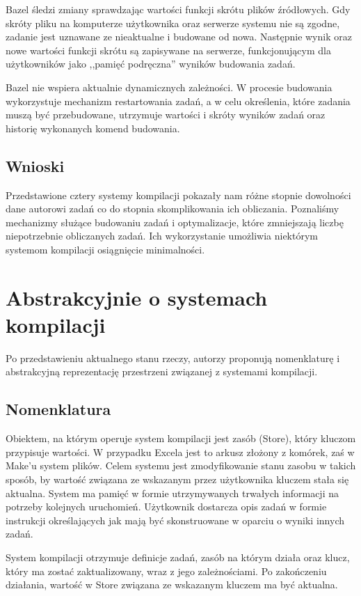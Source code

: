 Bazel śledzi zmiany sprawdzając wartości funkcji skrótu plików źródłowych. Gdy skróty pliku na komputerze użytkownika oraz serwerze systemu nie są zgodne, zadanie jest uznawane ze nieaktualne i budowane od nowa. Następnie wynik oraz nowe wartości funkcji skrótu są zapisywane na serwerze, funkcjonującym dla użytkowników jako ,,pamięć podręczna'' wyników budowania zadań.

Bazel nie wspiera aktualnie dynamicznych zależności. W procesie budowania wykorzystuje mechanizm restartowania zadań, a w celu określenia, które zadania muszą być przebudowane, utrzymuje wartości i skróty wyników zadań oraz historię wykonanych komend budowania.

\subsection{Wnioski}

Przedstawione cztery systemy kompilacji pokazały nam różne stopnie dowolności dane autorowi zadań co do stopnia skomplikowania ich obliczania. Poznaliśmy mechanizmy służące budowaniu zadań i optymalizacje, które zmniejszają liczbę niepotrzebnie obliczanych zadań. Ich wykorzystanie umożliwia niektórym systemom kompilacji osiągnięcie minimalności.

\section{Abstrakcyjnie o systemach kompilacji}

Po przedstawieniu aktualnego stanu rzeczy, autorzy proponują nomenklaturę i abstrakcyjną reprezentację przestrzeni związanej z systemami kompilacji.

\subsection{Nomenklatura}

Obiektem, na którym operuje system kompilacji jest zasób (Store), który kluczom przypisuje wartości. W przypadku Excela jest to arkusz złożony z komórek, zaś w Make'u system plików. Celem systemu jest zmodyfikowanie stanu zasobu w takich sposób, by wartość związana ze wskazanym przez użytkownika kluczem stała się aktualna. System ma pamięć w formie utrzymywanych trwałych informacji na potrzeby kolejnych uruchomień. Użytkownik dostarcza opis zadań w formie instrukcji określających jak mają być skonstruowane w oparciu o wyniki innych zadań.

System kompilacji otrzymuje definicje zadań, zasób na którym działa oraz klucz, który ma zostać zaktualizowany, wraz z jego zależnościami. Po zakończeniu działania, wartość w Store związana ze wskazanym kluczem ma być aktualna.

